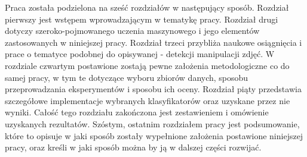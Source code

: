 Praca została podzielona na sześć rozdziałów w następujący sposób. Rozdział pierwszy jest wstępem wprowadzającym w tematykę pracy. Rozdział drugi dotyczy szeroko-pojmowanego uczenia maszynowego i jego elementów zastosowanych w niniejszej pracy. Rozdział trzeci przybliża naukowe osiągnięcia i prace o tematyce podobnej do opisywanej - detekcji manipulacji zdjęć. W rozdziale czwartym postawione zostają pewne założenia metodologiczne co do samej pracy, w tym te dotyczące wyboru zbiorów danych, sposobu przeprowadzania eksperymentów i sposobu ich oceny. Rozdział piąty przedstawia szczegółowe implementacje wybranych klasyfikatorów oraz uzyskane przez nie wyniki. Całość tego rozdziału zakończona jest zestawieniem i omówienie uzyskanych rezultatów. Szóstym, ostatnim rozdziałem pracy jest podsumowanie, które to opisuje w jaki sposób zostały wypełnione założenia postawione niniejszej pracy, oraz kreśli w jaki sposób można by ją w dalszej części rozwijać.
